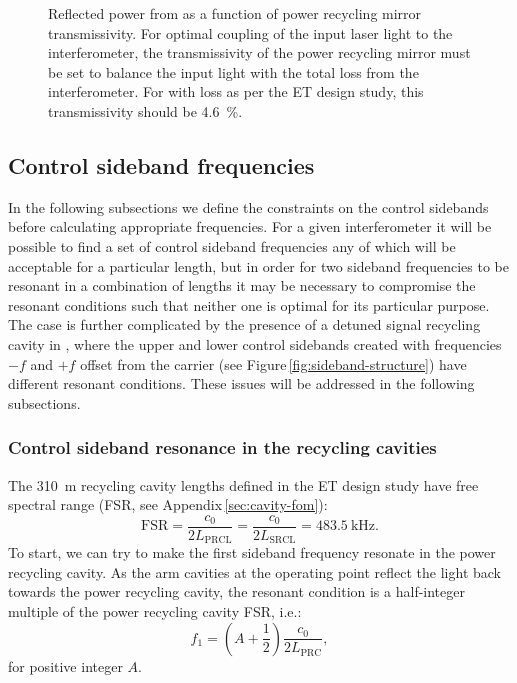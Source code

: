 \begin{figure}
  \centering
  
  \caption[Reflected power from \ETLF{} as a function of power recycling mirror transmissivity]{\label{fig:reflected-power-vs-prm-trans}Reflected power from \ETLF{} as a function of power recycling mirror transmissivity. For optimal coupling of the input laser light to the interferometer, the transmissivity of the power recycling mirror must be set to balance the input light with the total loss from the interferometer. For \ETLF{} with loss as per the \gls{ET} design study, this transmissivity should be \SI{4.6}{\percent}.}
\end{figure}

\subsection{\label{sec:control-sideband-freqs}Control sideband frequencies}
In the following subsections we define the constraints on the control sidebands before calculating appropriate frequencies. For a given interferometer it will be possible to find a set of control sideband frequencies any of which will be acceptable for a particular length, but in order for two sideband frequencies to be resonant in a combination of lengths it may be necessary to compromise the resonant conditions such that neither one is optimal for its particular purpose. The case is further complicated by the presence of a detuned signal recycling cavity in \ETLF{}, where the upper and lower control sidebands created with frequencies $-f$ and $+f$ offset from the carrier (see Figure\,\ref{fig:sideband-structure}) have different resonant conditions. These issues will be addressed in the following subsections.

\subsubsection{Control sideband resonance in the recycling cavities}
The \SI{310}{\meter} recycling cavity lengths defined in the \gls{ET} design study have free spectral range (\gls{FSR}, see Appendix\,\ref{sec:cavity-fom}):
\begin{equation}
  \text{FSR} = \frac{c_0}{2 L_{\text{PRCL}}} = \frac{c_0}{2 L_{\text{SRCL}}} = \SI{483.5}{\kilo\hertz}.
\end{equation}
To start, we can try to make the first sideband frequency resonate in the power recycling cavity. As the arm cavities at the operating point reflect the light back towards the power recycling cavity, the resonant condition is a half-integer multiple of the power recycling cavity \gls{FSR}, i.e.:
\begin{equation}
  \label{eq:prc-fsr}
  f_1 = \left(A + \frac{1}{2} \right) \frac{c_0}{2 L_{\text{PRC}}},
\end{equation}
for positive integer $A$.

